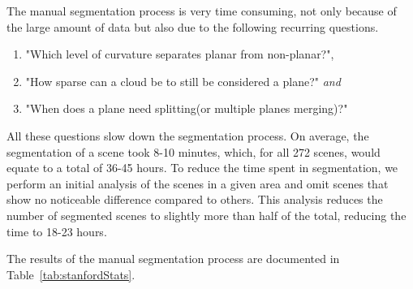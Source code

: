 \documentclass[main.tex]{subfiles}
\begin{document}
The manual segmentation process is very time consuming, not only because of the large amount of data but also due
to the following recurring questions.

\begin{enumerate}
    \item "Which level of curvature separates planar from non-planar?",
    \item "How sparse can a cloud be to still be considered a plane?" \textit{and}
    \item "When does a plane need splitting(or multiple planes merging)?"
\end{enumerate}
All these questions slow down the segmentation process. On average, the segmentation of a scene took 8-10 minutes, which, for all 272 scenes,
would equate to a total of 36-45 hours. To reduce the time spent in segmentation, we perform an initial analysis of the scenes in a given area
and omit scenes that show no noticeable difference compared to others. This analysis reduces the number of segmented scenes to slightly more than half
of the total, reducing the time to 18-23 hours.

The results of the manual segmentation process are documented in Table~\ref{tab:stanfordStats}.
\end{document}
